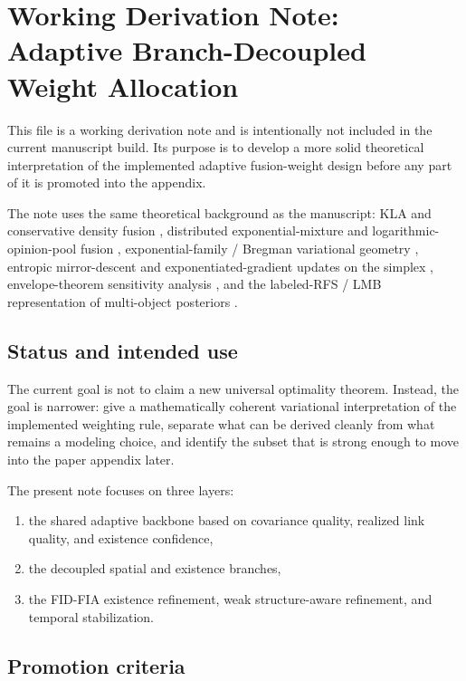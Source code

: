 \section*{Working Derivation Note: Adaptive Branch-Decoupled Weight Allocation}
\label{sec:working-derivation-adaptive-weights}

This file is a working derivation note and is intentionally not included in the current manuscript build. Its purpose is to develop a more solid theoretical interpretation of the implemented adaptive fusion-weight design before any part of it is promoted into the appendix.

The note uses the same theoretical background as the manuscript: KLA and conservative density fusion \citep{Battistelli2014KLA,Hlinka2014ICI}, distributed exponential-mixture and logarithmic-opinion-pool fusion \citep{Uney2013EMDPHD,Bandyopadhyay2018LogOP}, exponential-family / Bregman variational geometry \citep{WainwrightJordan2008,Banerjee2005Bregman}, entropic mirror-descent and exponentiated-gradient updates on the simplex \citep{KivinenWarmuth1997,BeckTeboulle2003}, envelope-theorem sensitivity analysis \citep{MilgromSegal2002}, and the labeled-RFS / LMB representation of multi-object posteriors \citep{Vo2014LRFS,Reuter2014LMB,Vo2019MSGLMB}.

\subsection*{Status and intended use}

The current goal is not to claim a new universal optimality theorem. Instead, the goal is narrower: give a mathematically coherent variational interpretation of the implemented weighting rule, separate what can be derived cleanly from what remains a modeling choice, and identify the subset that is strong enough to move into the paper appendix later.

The present note focuses on three layers:
\begin{enumerate}
\item the shared adaptive backbone based on covariance quality, realized link quality, and existence confidence,
\item the decoupled spatial and existence branches,
\item the FID-FIA existence refinement, weak structure-aware refinement, and temporal stabilization.
\end{enumerate}

\subsection*{Promotion criteria}


